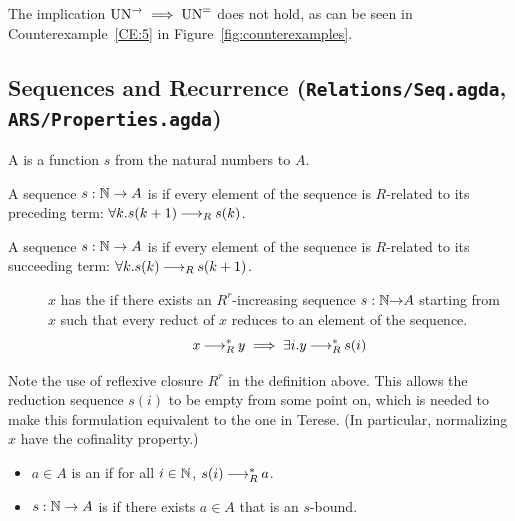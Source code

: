 \begin{remark}
    The implication $\mathrm{UN}^{\to} \implies \mathrm{UN}^{=}$ does not hold, as can be seen in Counterexample~\ref{CE:5} in Figure~\ref{fig:counterexamples}.
\end{remark}

\subsection{Sequences and Recurrence (\texttt{Relations/Seq.agda}, \texttt{ARS/Properties.agda})}


\begin{definition} \label{def:seq} \hfill
  \begin{description}
    \item \bq A  is a function $s$ from the natural numbers to $A$.
    \item \bq A sequence $s : \mathbb{N} \to A$ is  if every element of the sequence is $R$-related to its preceding term: $\forall k. s(k+1) \mathbin{\longrightarrow_R} s(k)$.
    \item \bq A sequence $s : \mathbb{N} \to A$ is  if every element of the sequence is $R$-related to its succeeding term: $\forall k. s(k) \mathbin{\longrightarrow_R} s(k+1)$.
  \end{description}
\end{definition}

\begin{definition}\hfill
    \begin{description}
        \item[\bq {}] $x$ has the  if there exists an $R^r$-increasing sequence
        \mbox{$s : \mathbb{N} {\to} A$} starting from $x$ such that every
        reduct of $x$ reduces to an element of the sequence.
        \[ x \mathbin{\longrightarrow_R^*} y \implies \exists i. y \mathbin{\longrightarrow_R^*} s(i) \]
    \end{description}
\end{definition}
Note the use of reflexive closure $R^r$ in the definition above. This 
allows the reduction sequence $s(i)$ to be empty from some point on, which is needed to make this formulation equivalent to the one in Terese.
(In particular, normalizing $x$ have the cofinality property.)
\begin{definition} \label{def:bound} \hfill
  \begin{itemize}
    \item [] \bq $a \in A$ is an  if for all $i \in \mathbb{N}$, $s (i) \mathbin{\longrightarrow_R^*} a$.
    \item [] \bq $s : \mathbb{N} \to A$ is  if there exists $a \in A$ that is an $s$-bound.
  \end{itemize}
\end{definition}


